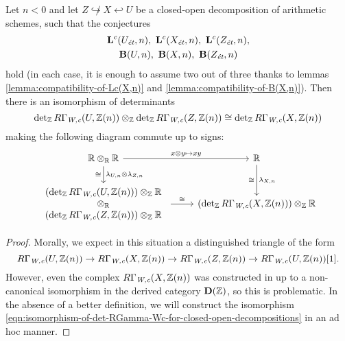 \documentclass{article}
\numberwithin{equation}{section}
\begin{document}
\begin{lemma}
  \label{lemma:lambda-and-closed-open-decompositions}
  Let $n < 0$ and let $Z \not\hookrightarrow X \hookleftarrow U$ be a
  closed-open decomposition of arithmetic schemes, such that the conjectures
  \begin{gather*}
    \mathbf{L}^c (U_\et,n), ~ \mathbf{L}^c (X_\et,n), ~ \mathbf{L}^c (Z_\et,n),\\
    \mathbf{B} (U,n), ~ \mathbf{B} (X,n), ~ \mathbf{B} (Z_\et,n)
  \end{gather*}
  hold (in each case, it is enough to assume two out of three thanks to lemmas
  \ref{lemma:compatibility-of-Lc(X,n)} and \ref{lemma:compatibility-of-B(X,n)}).
  Then there is an isomorphism of determinants
  \begin{equation}
    \label{eqn:isomorphism-of-det-RGamma-Wc-for-closed-open-decompositions}
    \det_\ZZ R\Gamma_\Wc (U, \ZZ(n)) \otimes_\ZZ
    \det_\ZZ R\Gamma_\Wc (Z, \ZZ(n)) \cong
    \det_\ZZ R\Gamma_\Wc (X, \ZZ(n))
  \end{equation}
  making the following diagram commute up to signs:
  \begin{equation}
    \label{eqn:lambda-and-closed-open-decompositions}
    \begin{tikzcd}
      \RR \otimes_\RR \RR \ar{r}{x\otimes y \mapsto xy}\ar{d}{\lambda_{U,n} \otimes \lambda_{Z,n}}[swap]{\cong} & \RR\ar{d}{\lambda_{X,n}}[swap]{\cong} \\
      \begin{array}{c} (\det_\ZZ R\Gamma_\Wc (U, \ZZ(n)))\otimes_\ZZ \RR \\ \otimes_\RR \\ (\det_\ZZ R\Gamma_\Wc (Z, \ZZ(n)))\otimes_\ZZ \RR \end{array} \ar{r}{\cong} & (\det_\ZZ R\Gamma_\Wc (X, \ZZ(n))) \otimes_\ZZ \RR
    \end{tikzcd}
  \end{equation}

  \begin{proof}
    Morally, we expect in this situation a distinguished triangle of the form
    \[ R\Gamma_\Wc (U, \ZZ(n)) \to
      R\Gamma_\Wc (X, \ZZ(n)) \to
      R\Gamma_\Wc (Z, \ZZ(n)) \to
      R\Gamma_\Wc (U, \ZZ(n)) [1]. \]
    However, even the complex $R\Gamma_\Wc (X, \ZZ(n))$ was constructed in
    \cite{Beshenov-Weil-etale-1} up to a non-canonical isomorphism in
    the derived category $\mathbf{D} (\ZZ)$, so this is problematic. In the
    absence of a better definition, we will construct the isomorphism
    \eqref{eqn:isomorphism-of-det-RGamma-Wc-for-closed-open-decompositions} in
    an ad hoc manner.


\end{proof}
\end{lemma}
\end{document}

